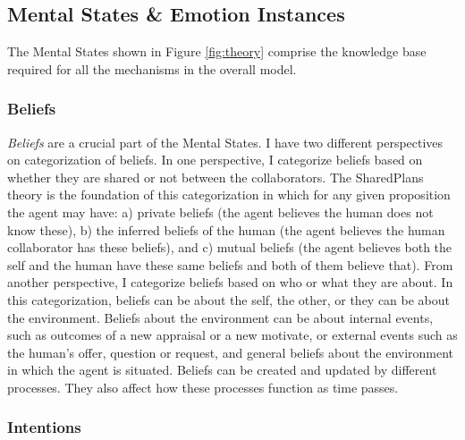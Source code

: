 \subsection{Mental States \& Emotion Instances}

The Mental States shown in Figure \ref{fig:theory} comprise the knowledge base
required for all the mechanisms in the overall model.

\subsubsection{Beliefs}
\label{sec:beliefs}

\textit{Beliefs} are a crucial part of the Mental States. I have two different
perspectives on categorization of beliefs. In one perspective, I categorize
beliefs based on whether they are shared or not between the collaborators. The
SharedPlans \cite{grosz:plans-discourse} theory is the foundation of this
categorization in which for any given proposition the agent may have: a) private
beliefs (the agent believes the human does not know these), b) the inferred
beliefs of the human (the agent believes the human collaborator has these
beliefs), and c) mutual beliefs (the agent believes both the self and the human
have these same beliefs and both of them believe that). From another
perspective, I categorize beliefs based on who or what they are about. In this
categorization, beliefs can be about the self, the other, or they can be about
the environment. Beliefs about the environment can be about internal events,
such as outcomes of a new appraisal or a new motivate, or external events such
as the human's offer, question or request, and general beliefs about the
environment in which the agent is situated. Beliefs can be created and updated
by different processes. They also affect how these processes function as time
passes.

\subsubsection{Intentions}
\label{sec:intentions}

